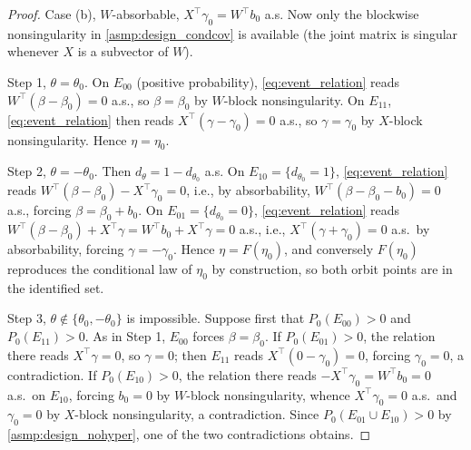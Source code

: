 \documentclass[11pt]{article}
\theoremstyle{definition}
\theoremstyle{plain}
\begin{document}
\begin{proof}
Case (b), $W$-absorbable, $X^\top\gamma_0=W^\top b_0$ a.s. Now only the blockwise nonsingularity in \ref{asmp:design_condcov} is available (the joint matrix is singular whenever $X$ is a subvector of $W$).

Step 1, $\theta=\theta_0$. On $E_{00}$ (positive probability), \eqref{eq:event_relation} reads $W^\top(\beta-\beta_0)=0$ a.s., so $\beta=\beta_0$ by $W$-block nonsingularity. On $E_{11}$, \eqref{eq:event_relation} then reads $X^\top(\gamma-\gamma_0)=0$ a.s., so $\gamma=\gamma_0$ by $X$-block nonsingularity. Hence $\eta=\eta_0$.

Step 2, $\theta=-\theta_0$. Then $d_\theta=1-d_{\theta_0}$ a.s. On $E_{10}=\{d_{\theta_0}=1\}$, \eqref{eq:event_relation} reads $W^\top(\beta-\beta_0)-X^\top\gamma_0=0$, i.e., by absorbability, $W^\top(\beta-\beta_0-b_0)=0$ a.s., forcing $\beta=\beta_0+b_0$. On $E_{01}=\{d_{\theta_0}=0\}$, \eqref{eq:event_relation} reads $W^\top(\beta-\beta_0)+X^\top\gamma=W^\top b_0+X^\top\gamma=0$ a.s., i.e., $X^\top(\gamma+\gamma_0)=0$ a.s.\ by absorbability, forcing $\gamma=-\gamma_0$. Hence $\eta=F(\eta_0)$, and conversely $F(\eta_0)$ reproduces the conditional law of $\eta_0$ by construction, so both orbit points are in the identified set.

Step 3, $\theta\notin\{\theta_0,-\theta_0\}$ is impossible. Suppose first that $P_0(E_{00})>0$ and $P_0(E_{11})>0$. As in Step 1, $E_{00}$ forces $\beta=\beta_0$. If $P_0(E_{01})>0$, the relation there reads $X^\top\gamma=0$, so $\gamma=0$; then $E_{11}$ reads $X^\top(0-\gamma_0)=0$, forcing $\gamma_0=0$, a contradiction. If $P_0(E_{10})>0$, the relation there reads $-X^\top\gamma_0=W^\top b_0=0$ a.s.\ on $E_{10}$, forcing $b_0=0$ by $W$-block nonsingularity, whence $X^\top\gamma_0=0$ a.s.\ and $\gamma_0=0$ by $X$-block nonsingularity, a contradiction. Since $P_0(E_{01}\cup E_{10})>0$ by \ref{asmp:design_nohyper}, one of the two contradictions obtains.


\end{proof}
\end{document}
